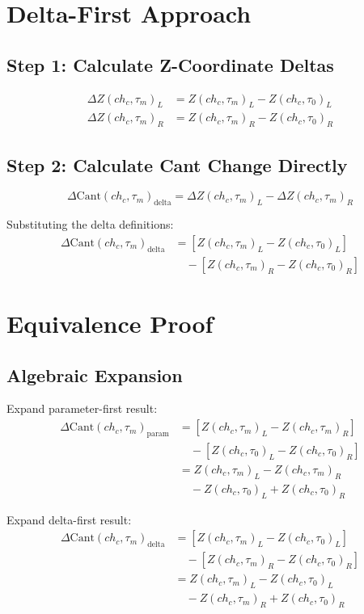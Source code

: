 \documentclass{article}
\begin{document}
\section{Delta-First Approach}

\subsection{Step 1: Calculate Z-Coordinate Deltas}
\begin{align}
\Delta Z(ch_c, \tau_m)_L &= Z(ch_c, \tau_m)_L - Z(ch_c, \tau_0)_L \\
\Delta Z(ch_c, \tau_m)_R &= Z(ch_c, \tau_m)_R - Z(ch_c, \tau_0)_R
\end{align}

\subsection{Step 2: Calculate Cant Change Directly}
\begin{equation}
\Delta\text{Cant}(ch_c, \tau_m)_{\text{delta}} = \Delta Z(ch_c, \tau_m)_L - \Delta Z(ch_c, \tau_m)_R
\end{equation}

Substituting the delta definitions:
\begin{align}
\Delta\text{Cant}(ch_c, \tau_m)_{\text{delta}} &= [Z(ch_c, \tau_m)_L - Z(ch_c, \tau_0)_L] \nonumber \\
&\quad - [Z(ch_c, \tau_m)_R - Z(ch_c, \tau_0)_R]
\end{align}

\section{Equivalence Proof}

\subsection{Algebraic Expansion}
Expand parameter-first result:
\begin{align}
\Delta\text{Cant}(ch_c, \tau_m)_{\text{param}} &= [Z(ch_c, \tau_m)_L - Z(ch_c, \tau_m)_R] \\
&\quad - [Z(ch_c, \tau_0)_L - Z(ch_c, \tau_0)_R] \\
&= Z(ch_c, \tau_m)_L - Z(ch_c, \tau_m)_R \\
&\quad - Z(ch_c, \tau_0)_L + Z(ch_c, \tau_0)_R
\end{align}

Expand delta-first result:
\begin{align}
\Delta\text{Cant}(ch_c, \tau_m)_{\text{delta}} &= [Z(ch_c, \tau_m)_L - Z(ch_c, \tau_0)_L] \\
&\quad - [Z(ch_c, \tau_m)_R - Z(ch_c, \tau_0)_R] \\
&= Z(ch_c, \tau_m)_L - Z(ch_c, \tau_0)_L \\
&\quad - Z(ch_c, \tau_m)_R + Z(ch_c, \tau_0)_R
\end{align}
\end{document}
